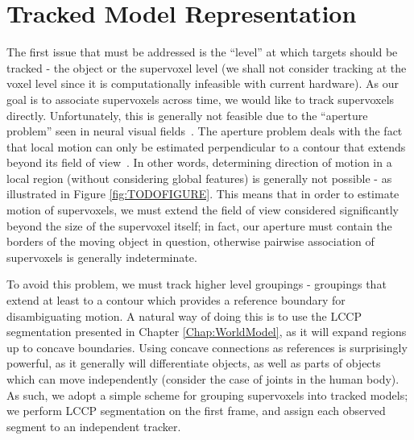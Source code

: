 
\section{Tracked Model Representation}
The first issue that must be addressed is the ``level'' at which targets should be tracked - the object or the supervoxel level (we shall not consider tracking at the voxel level since it is computationally infeasible with current hardware). As our goal is to associate supervoxels across time, we would like to track supervoxels directly. Unfortunately, this is generally not feasible due to the ``aperture problem'' seen in neural visual fields~\cite{MarrApertureProblem}. The aperture problem deals with the fact that local motion can only be estimated perpendicular to a contour that extends beyond its field of view~\cite{shimojo1989}. In other words, determining direction of motion in a local region (without considering global features) is generally not possible - as illustrated in Figure \ref{fig:TODOFIGURE}. This means that in order to estimate motion of supervoxels, we must extend the field of view considered significantly beyond the size of the supervoxel itself; in fact, our aperture must contain the borders of the moving object in question, otherwise pairwise association of supervoxels is generally indeterminate. 


To avoid this problem, we must track higher level groupings - groupings that extend at least to a contour which provides a reference boundary for disambiguating motion. A natural way of doing this is to use the LCCP segmentation presented in Chapter \ref{Chap:WorldModel}, as it will expand regions up to concave boundaries. Using concave connections as references is surprisingly powerful, as it generally will differentiate objects, as well as parts of objects which can move independently (consider the case of joints in the human body). As such, we adopt a simple scheme for grouping supervoxels into tracked models; we perform LCCP segmentation on the first frame, and assign each observed segment to an independent tracker.

